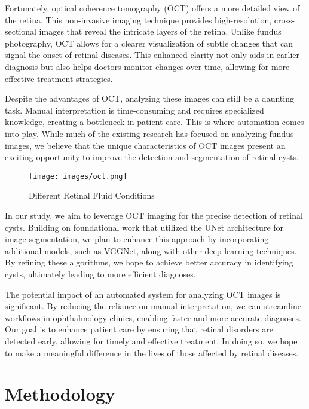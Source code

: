 \documentclass{article}
\begin{document}
Fortunately, optical coherence tomography (OCT) offers a more detailed view of the retina. This non-invasive imaging technique provides high-resolution, cross-sectional images that reveal the intricate layers of the retina. Unlike fundus photography, OCT allows for a clearer visualization of subtle changes that can signal the onset of retinal diseases. This enhanced clarity not only aids in earlier diagnosis but also helps doctors monitor changes over time, allowing for more effective treatment strategies.

Despite the advantages of OCT, analyzing these images can still be a daunting task. Manual interpretation is time-consuming and requires specialized knowledge, creating a bottleneck in patient care. This is where automation comes into play. While much of the existing research has focused on analyzing fundus images, we believe that the unique characteristics of OCT images present an exciting opportunity to improve the detection and segmentation of retinal cysts.

\begin{figure}[h!]
    \centering
    \texttt{[image: images/oct.png]}
    \caption{Different Retinal Fluid Conditions}
    \label{Retinal Fluid Diseases}
\end{figure}

In our study, we aim to leverage OCT imaging for the precise detection of retinal cysts. Building on foundational work that utilized the UNet architecture for image segmentation, we plan to enhance this approach by incorporating additional models, such as VGGNet, along with other deep learning techniques. By refining these algorithms, we hope to achieve better accuracy in identifying cysts, ultimately leading to more efficient diagnoses.

\newpage

The potential impact of an automated system for analyzing OCT images is significant. By reducing the reliance on manual interpretation, we can streamline workflows in ophthalmology clinics, enabling faster and more accurate diagnoses. Our goal is to enhance patient care by ensuring that retinal disorders are detected early, allowing for timely and effective treatment. In doing so, we hope to make a meaningful difference in the lives of those affected by retinal diseases.


\section{Methodology}
\end{document}

